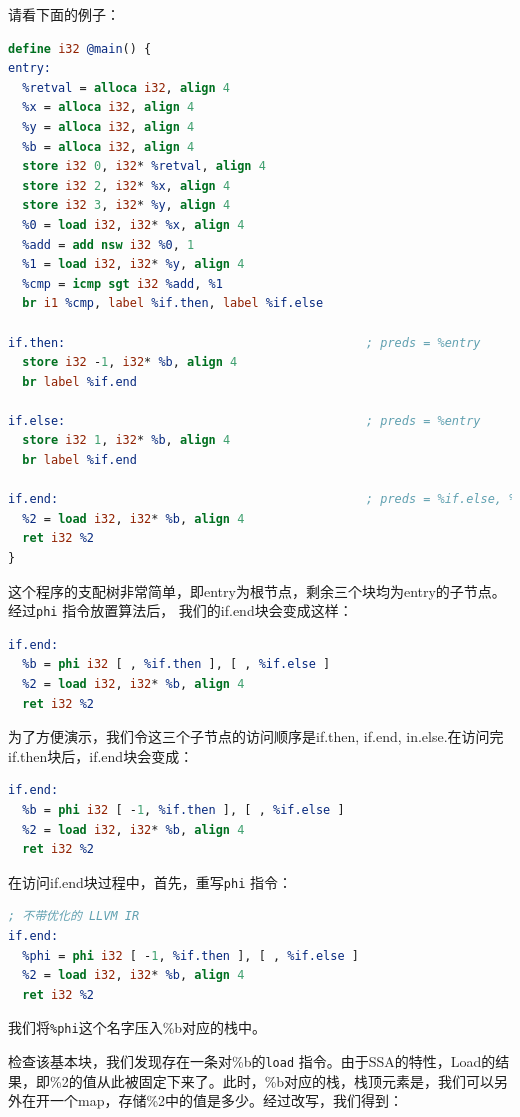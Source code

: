 请看下面的例子：

\begin{lstlisting}[language=LLVM]
define i32 @main() {
entry:
  %retval = alloca i32, align 4
  %x = alloca i32, align 4
  %y = alloca i32, align 4
  %b = alloca i32, align 4
  store i32 0, i32* %retval, align 4
  store i32 2, i32* %x, align 4
  store i32 3, i32* %y, align 4
  %0 = load i32, i32* %x, align 4
  %add = add nsw i32 %0, 1
  %1 = load i32, i32* %y, align 4
  %cmp = icmp sgt i32 %add, %1
  br i1 %cmp, label %if.then, label %if.else

if.then:                                          ; preds = %entry
  store i32 -1, i32* %b, align 4
  br label %if.end

if.else:                                          ; preds = %entry
  store i32 1, i32* %b, align 4
  br label %if.end

if.end:                                           ; preds = %if.else, %if.then
  %2 = load i32, i32* %b, align 4
  ret i32 %2
}
\end{lstlisting}

这个程序的支配树非常简单，即entry为根节点，剩余三个块均为entry的子节点。
经过\texttt{phi} 指令放置算法后， 我们的if.end块会变成这样：

\begin{lstlisting}[language=LLVM]
if.end:
  %b = phi i32 [ , %if.then ], [ , %if.else ]
  %2 = load i32, i32* %b, align 4
  ret i32 %2
\end{lstlisting}

为了方便演示，我们令这三个子节点的访问顺序是if.then, if.end, in.else.在访问完if.then块后，if.end块会变成：

\begin{lstlisting}[language=LLVM]
if.end:
  %b = phi i32 [ -1, %if.then ], [ , %if.else ]
  %2 = load i32, i32* %b, align 4
  ret i32 %2
\end{lstlisting}

在访问if.end块过程中，首先，重写\texttt{phi} 指令：

\begin{lstlisting}[language=LLVM]
; 不带优化的 LLVM IR
if.end:
  %phi = phi i32 [ -1, %if.then ], [ , %if.else ]
  %2 = load i32, i32* %b, align 4
  ret i32 %2
\end{lstlisting}

我们将\texttt{\%phi}这个名字压入\%b对应的栈中。 

检查该基本块，我们发现存在一条对\%b的\texttt{load} 指令。由于SSA的特性，Load的结果，即\%2的值从此被固定下来了。此时，\%b对应的栈，栈顶元素是，我们可以另外在开一个map，存储\%2中的值是多少。经过改写，我们得到：

